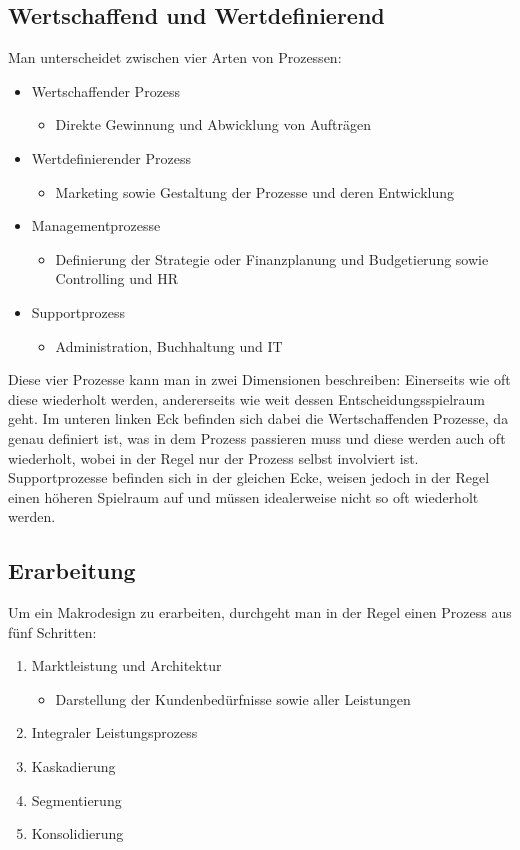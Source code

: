 \documentclass{article}
\begin{document}
  \subsection{Wertschaffend und Wertdefinierend}
  Man unterscheidet zwischen vier Arten von Prozessen:
  \begin{itemize}
    \item{Wertschaffender Prozess}
    \begin{itemize}
      \item{Direkte Gewinnung und Abwicklung von Aufträgen}
    \end{itemize}
    \item{Wertdefinierender Prozess}
    \begin{itemize}
      \item{Marketing sowie Gestaltung der Prozesse und deren Entwicklung}
    \end{itemize}
    \item{Managementprozesse}
    \begin{itemize}
      \item{Definierung der Strategie oder Finanzplanung und Budgetierung sowie Controlling und HR}
    \end{itemize}
    \item{Supportprozess}
    \begin{itemize}
      \item{Administration, Buchhaltung und IT}
    \end{itemize}
  \end{itemize}
  Diese vier Prozesse kann man in zwei Dimensionen beschreiben: Einerseits wie oft diese wiederholt werden, andererseits wie weit dessen Entscheidungsspielraum geht. Im unteren linken Eck befinden sich dabei die Wertschaffenden Prozesse, da genau definiert ist, was in dem Prozess passieren muss und diese werden auch oft wiederholt, wobei in der Regel nur der Prozess selbst involviert ist. \\
  Supportprozesse befinden sich in der gleichen Ecke, weisen jedoch in der Regel einen höheren Spielraum auf und müssen idealerweise nicht so oft wiederholt werden.
  \subsection{Erarbeitung}
  Um ein Makrodesign zu erarbeiten, durchgeht man in der Regel einen Prozess aus fünf Schritten:
  \begin{enumerate}
    \item{Marktleistung und Architektur}
    \begin{itemize}
      \item{Darstellung der Kundenbedürfnisse sowie aller Leistungen}
    \end{itemize}
    \item{Integraler Leistungsprozess}
    \item{Kaskadierung}
    \item{Segmentierung}
    \item{Konsolidierung}
  \end{enumerate}
\end{document}
